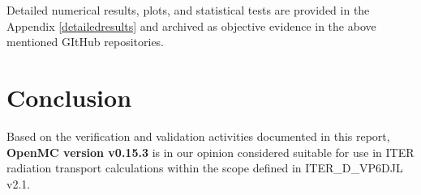 \documentclass[11pt,a4paper]{article}
\begin{document}
Detailed numerical results, plots, and statistical tests are provided in the
Appendix \ref{detailedresults} and archived as objective evidence in the above mentioned GItHub repositories.

\section{Conclusion}

Based on the verification and validation activities documented in this report,
\textbf{OpenMC version v0.15.3} is in our opinion considered suitable for use in
ITER radiation transport calculations within the scope defined in ITER\_D\_VP6DJL v2.1. 

\appendix

\newpage



\newpage



\newpage


\newpage

\end{document}
